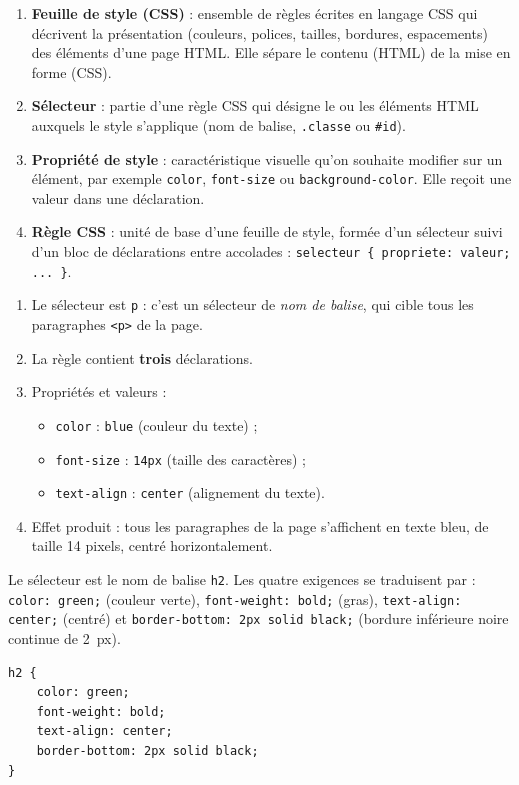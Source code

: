 \documentclass[11pt]{article}
\newcommand{\cle}[1]{{\popxbold\color{popdark}#1}}
\begin{document}
\begin{corrige}
\begin{enumerate}
  \item \textbf{Feuille de style (CSS)} : ensemble de règles écrites en langage \cle{CSS} qui décrivent la présentation (couleurs, polices, tailles, bordures, espacements) des éléments d'une page \cle{HTML}. Elle sépare le contenu (HTML) de la mise en forme (CSS).
  \item \textbf{Sélecteur} : partie d'une règle \cle{CSS} qui désigne le ou les éléments \cle{HTML} auxquels le style s'applique (nom de balise, \texttt{.classe} ou \texttt{\#id}).
  \item \textbf{Propriété de style} : caractéristique visuelle qu'on souhaite modifier sur un élément, par exemple \texttt{color}, \texttt{font-size} ou \texttt{background-color}. Elle reçoit une valeur dans une déclaration.
  \item \textbf{Règle CSS} : unité de base d'une feuille de style, formée d'un sélecteur suivi d'un bloc de déclarations entre accolades : \texttt{selecteur \{ propriete: valeur; ... \}}.
\end{enumerate}
\end{corrige}

\begin{corrige}
\begin{enumerate}
  \item Le sélecteur est \texttt{p} : c'est un sélecteur de \emph{nom de balise}, qui cible tous les paragraphes \texttt{<p>} de la page.
  \item La règle contient \textbf{trois} déclarations.
  \item Propriétés et valeurs :
  \begin{itemize}
    \item \texttt{color} : \texttt{blue} (couleur du texte) ;
    \item \texttt{font-size} : \texttt{14px} (taille des caractères) ;
    \item \texttt{text-align} : \texttt{center} (alignement du texte).
  \end{itemize}
  \item Effet produit : tous les paragraphes de la page s'affichent en texte bleu, de taille 14 pixels, centré horizontalement.
\end{enumerate}
\end{corrige}

\begin{corrige}
Le sélecteur est le nom de balise \texttt{h2}. Les quatre exigences se traduisent par : \texttt{color: green;} (couleur verte), \texttt{font-weight: bold;} (gras), \texttt{text-align: center;} (centré) et \texttt{border-bottom: 2px solid black;} (bordure inférieure noire continue de \SI{2}{px}).
\begin{lstlisting}
h2 {
    color: green;
    font-weight: bold;
    text-align: center;
    border-bottom: 2px solid black;
}
\end{lstlisting}
\end{corrige}
\end{document}
